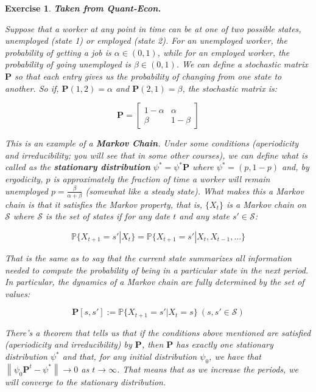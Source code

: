 \documentclass[a4paper,12pt]{article}
\newtheorem{exercise}{Exercise}
\begin{document}
\begin{exercise}

\textbf{Taken from Quant-Econ.}

Suppose that a worker at any point in time can be at one of two possible states, unemployed (state 1) or employed (state 2). For an unemployed worker, the probability of getting a job is $\alpha\in(0,1)$, while for an employed worker, the probability of going unemployed is $\beta\in(0,1)$. We can define a stochastic matrix $\mathbf{P}$ so that each entry gives us the probability of changing from one state to another. So if, $\mathbf{P}(1,2) = \alpha$ and $\mathbf{P}(2,1) = \beta$, the stochastic matrix is:

\[
\mathbf{P} = \begin{bmatrix}
1-\alpha & \alpha \\
\beta & 1-\beta
\end{bmatrix}
\]
	
This is an example of a \textbf{Markov Chain}. Under some conditions (aperiodicity and irreducibility; you will see that in some other courses), we can define what is called as the \textbf{stationary distribution} $\psi^* = \psi^* \mathbf{P}$ where $\psi^* = (p, 1-p)$ and, by ergodicity, $p$ is approximately the fraction of time a worker will remain unemployed $p = \frac{\beta}{\alpha + \beta}$ (somewhat like a steady state). What makes this a Markov chain is that it satisfies the Markov property, that is, $\{X_t\}$ is a Markov chain on $\mathcal{S}$ where $\mathcal{S}$ is the set of states if for any date $t$ and any state $s'\in \mathcal{S}$:

\[
\mathbb{P}\{X_{t+1} = s' | X_t\} = \mathbb{P}\{X_{t+1} = s' | X_t, X_{t-1},\ldots\}
\]
	
That is the same as to say that the current state summarizes all information needed to compute the probability of being in a particular state in the next period. In particular, the dynamics of a Markov chain are fully determined by the set of values:
	
\[
\mathbf{P}[s,s'] := \mathbb{P}\{X_{t+1} = s' | X_t = s\} \ (s,s'\in\mathcal{S})
\]
	
There's a theorem that tells us that if the conditions above mentioned are satisfied (aperiodicity and irreducibility) by $\mathbf{P}$, then $\mathbf{P}$ has exactly one stationary distribution $\psi^*$ and that, for any initial distribution $\psi_0$, we have that $\left\lVert \psi_0 \mathbf{P}^t - \psi^* \right\rVert\rightarrow 0$ as $t\rightarrow\infty$. That means that as we increase the periods, we will converge to the stationary distribution.
	

\end{exercise}
\end{document}
